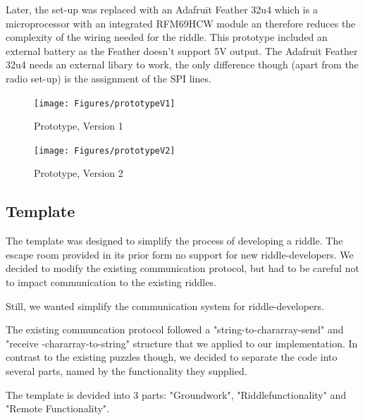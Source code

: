 Later, the set-up was replaced with an Adafruit Feather 32u4 which is a microprocessor with an integrated 
RFM69HCW module an therefore reduces the complexity of the wiring needed for the riddle.
This prototype included an external battery as the Feather doesn't support 5V output.
The Adafruit Feather 32u4 needs an external libary to work, the only difference though (apart from the radio set-up)
is the assignment of the SPI lines.

\begin{figure}[H]
	\centering
	\texttt{[image: Figures/prototypeV1]}
	\decoRule
	\caption[prototypeV1]{Prototype, Version 1}
	\label{fig:prototypeV1}
\end{figure}


\begin{figure}[H]
	\centering
	\texttt{[image: Figures/prototypeV2]}
	\decoRule
	\caption[prototypeV2]{Prototype, Version 2}
	\label{fig:prototypeV2}
\end{figure}

\subsection{Template}

The template was designed to simplify the process of developing a riddle.
The escape room provided in its prior form no support for new riddle-developers.
We decided to modify the existing communication protocol, 
but had to be careful not to impact communication to the existing riddles.

Still, we wanted simplify the communication system for riddle-developers.

The existing communcation protocol followed a "string-to-chararray-send" and "receive -chararray-to-string" structure that we applied to our implementation.
In contrast to the existing puzzles though, we decided to separate the code into several parts, named by the functionality they supplied.

The template is devided into 3 parts: "Groundwork", "Riddlefunctionality" and "Remote Functionality".

